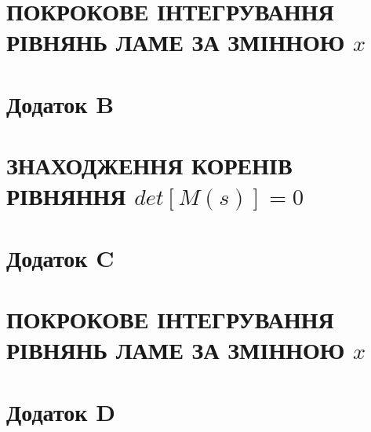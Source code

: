 \documentclass[a4paper,10pt]{extarticle}
\numberwithin{equation}{section}
\begin{document}
\section*{\centering ПОКРОКОВЕ ІНТЕГРУВАННЯ РІВНЯНЬ ЛАМЕ ЗА ЗМІННОЮ $x$}


\section[Додаток B ЗНАХОДЖЕННЯ КОРЕНІВ РІВНЯННЯ $det M(s)=0$ ]{\centering Додаток B}\label{ap_B}
\section*{\centering ЗНАХОДЖЕННЯ КОРЕНІВ РІВНЯННЯ $det[M(s)]=0$}


\section[Додаток C]{\centering Додаток C}\label{ap_C}
\section*{\centering ПОКРОКОВЕ ІНТЕГРУВАННЯ РІВНЯНЬ ЛАМЕ ЗА ЗМІННОЮ $x$}


\section*{Додаток D}\label{ap_d}

\end{document}
